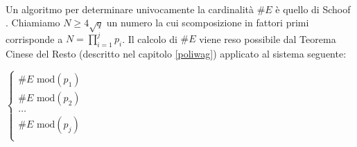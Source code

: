 \documentclass[a4paper,12pt]{tesiinfo}
\begin{document}
\\
Un algoritmo per determinare univocamente la cardinalit\`a $\#E$ \`e quello di Schoof \cite{schoof}. Chiamiamo $N \geq 4\sqrt{q}$ un numero la cui scomposizione in fattori primi corrisponde a $N=\prod_{i=1}^j p_i $. Il calcolo di $\#E$ viene reso possibile dal Teorema Cinese del Resto (descritto nel capitolo \ref{poliwag}) applicato al sistema seguente:
\begin{center}$
\begin{cases}
    \#E \text{ mod}(p_1)\\
    \#E \text{ mod}(p_2)\\
    \ldots \\
    \#E \text{ mod}(p_j)\\
\end{cases}$
\end{center}
%
%
%
%
%
%
%
%
%
\end{document}
